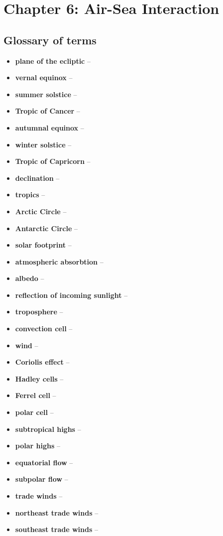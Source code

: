 \section{Chapter 6: Air-Sea Interaction}

\subsection{Glossary of terms}
\begin{itemize}
	\item \textbf{plane of the ecliptic} --
	\item \textbf{vernal equinox} --
	\item \textbf{summer solstice} --
	\item \textbf{Tropic of Cancer} --
	\item \textbf{autumnal equinox} --
	\item \textbf{winter solstice} --
	\item \textbf{Tropic of Capricorn} --
	\item \textbf{declination} --
	\item \textbf{tropics} --
	\item \textbf{Arctic Circle} --
	\item \textbf{Antarctic Circle} --
	\item \textbf{solar footprint} --
	\item \textbf{atmospheric absorbtion} --
	\item \textbf{albedo} --
	\item \textbf{reflection of incoming sunlight} --
	\item \textbf{troposphere} --
	\item \textbf{convection cell} --
	\item \textbf{wind} --
	\item \textbf{Coriolis effect} --
	\item \textbf{Hadley cells} --
	\item \textbf{Ferrel cell} --
	\item \textbf{polar cell} --
	\item \textbf{subtropical highs} --
	\item \textbf{polar highs} --
	\item \textbf{equatorial flow} --
	\item \textbf{subpolar flow} --
	\item \textbf{trade winds} --
	\item \textbf{northeast trade winds} --
	\item \textbf{southeast trade winds} --

\end{itemize}
